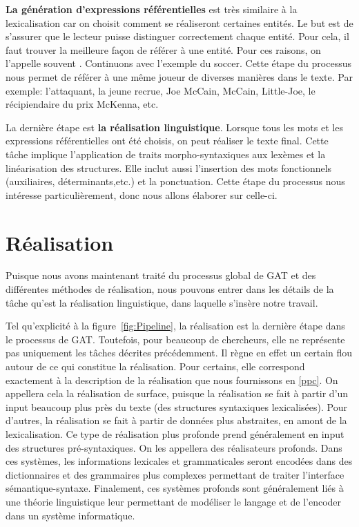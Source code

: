 \textbf{La génération d'expressions référentielles} est très similaire à la lexicalisation car on choisit comment se réaliseront certaines entités. Le but est de s'assurer que le lecteur puisse distinguer correctement chaque entité. Pour cela, il faut trouver la meilleure façon de référer à une entité. Pour ces raisons, on l'appelle souvent . Continuons avec l'exemple du soccer. Cette étape du processus nous permet de référer à une même joueur de diverses manières dans le texte. Par exemple: l'attaquant, la jeune recrue, Joe McCain, McCain, Little-Joe, le récipiendaire du prix McKenna, etc.

La dernière étape est \textbf{la réalisation linguistique}. Lorsque tous les mots et les expressions référentielles ont été choisis, on peut réaliser le texte final. Cette tâche implique l'application de traits morpho-syntaxiques aux lexèmes et la linéarisation des structures. Elle inclut aussi l'insertion des mots fonctionnels (auxiliaires, déterminants,etc.) et la ponctuation. Cette étape du processus nous intéresse particulièrement, donc nous allons élaborer sur celle-ci.





\section{Réalisation}

Puisque nous avons maintenant traité du processus global de \ac{GAT} et des différentes méthodes de réalisation, nous pouvons entrer dans les détails de la tâche qu'est la réalisation linguistique, dans laquelle s'insère notre travail.

Tel qu'explicité à la figure~\ref{fig:Pipeline}, la réalisation est la dernière étape dans le processus de \ac{GAT}. Toutefois, pour beaucoup de chercheurs, elle ne représente pas uniquement les tâches décrites précédemment. Il règne en effet un certain flou autour de ce qui constitue la réalisation. Pour certains, elle correspond exactement à la description de la réalisation que nous fournissons en \ref{ppc}. On appellera cela la réalisation de surface, puisque la réalisation se fait à partir d'un input beaucoup plus près du texte (des structures syntaxiques lexicalisées). Pour d'autres, la réalisation se fait à partir de données plus abstraites, en amont de la lexicalisation. Ce type de réalisation plus profonde prend généralement en input des structures pré-syntaxiques. On les appellera des réalisateurs profonds. Dans ces systèmes, les informations lexicales et grammaticales seront encodées dans des dictionnaires et des grammaires plus complexes permettant de traiter l'interface sémantique-syntaxe. Finalement, ces systèmes profonds sont généralement liés à une théorie linguistique leur permettant de modéliser le langage et de l'encoder dans un système informatique.

